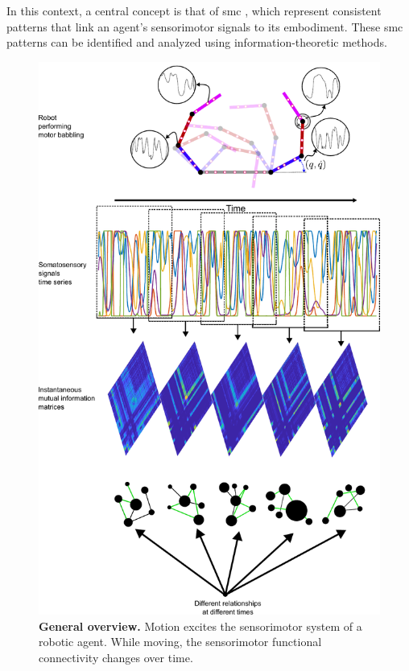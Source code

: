 In this context, a central concept is that of \ac{smc} \cite{Jacquey2019Sensorimotorcontingenciesas}, which represent consistent patterns that link an agent's sensorimotor signals to its embodiment. These \ac{smc} patterns can be identified and analyzed using information-theoretic methods. 
\begin{figure}[!ht]
	\centering
	\includegraphics[width=0.9\columnwidth]{somatosensry_dynamic_functional_connectivity.pdf}
	\caption{\textbf{General overview.} Motion excites the sensorimotor system of a robotic agent. While moving, the sensorimotor functional connectivity changes over time.}
	\label{fig:general_overview}
\end{figure}
